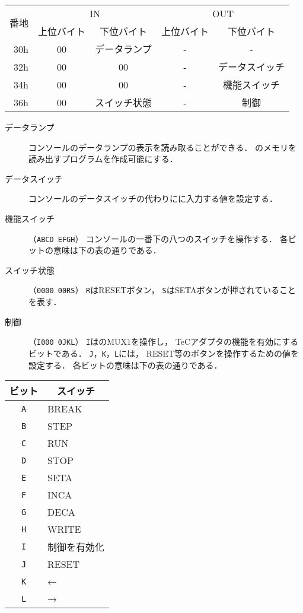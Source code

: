 \begin{center}
  \small\begin{tabular}{| r | c | c || c | c |}\hline
    \multirow{2}{*}{番地}
    & \multicolumn{2}{c||}{IN}
    & \multicolumn{2}{c|}{OUT}
    \\\cline{2-5}
         & 上位バイト & 下位バイト & 上位バイト & 下位バイト
    \\\hline\hline
    30h  &  00 & データランプ
         &  -  & -              \\\hline
    32h  &  00 & 00
         &  -  & データスイッチ \\\hline
    34h  &  00 & 00
         &  -  & 機能スイッチ   \\\hline
    36h  &  00 & スイッチ状態
         &  -  & 制御           \\\hline
  \end{tabular}
\end{center}

\begin{description}
\item[データランプ]
  {\tec}コンソールのデータランプの表示を読み取ることができる．
  {\tec}のメモリを読み出す{\tac}プログラムを作成可能にする．
\item[データスイッチ]
  コンソールのデータスイッチの代わりに{\tec}に入力する値を設定する．
\item[機能スイッチ]（\texttt{ABCD EFGH}）
  {\tec}コンソールの一番下の八つのスイッチを操作する．
  各ビットの意味は下の表の通りである．
\item[スイッチ状態]（\texttt{0000 00RS}）
  \texttt{R}はRESETボタン，
  \texttt{S}はSETAボタンが押されていることを表す．
\item[制御]（\texttt{I000 0JKL}）
  \texttt{I}はのMUX1を操作し，
  TeCアダプタの機能を有効にするビットである．
  \texttt{J}，\texttt{K}，\texttt{L}には，
  RESET等のボタンを操作するための値を設定する．
  各ビットの意味は下の表の通りである．
\end{description}

\begin{center}
  \small\begin{tabular}{c | l}\hline\hline
  ビット     & \multicolumn{1}{c}{スイッチ}\\\hline
  \texttt{A} & BREAK \\
  \texttt{B} & STEP  \\
  \texttt{C} & RUN   \\
  \texttt{D} & STOP  \\
  \texttt{E} & SETA  \\
  \texttt{F} & INCA  \\
  \texttt{G} & DECA  \\
  \texttt{H} & WRITE \\
  \texttt{I} & 制御を有効化 \\
  \texttt{J} & RESET \\
  \texttt{K} & ←  \\
  \texttt{L} & →  \\
  \end{tabular}
\end{center}

